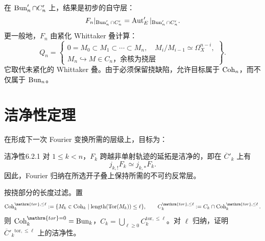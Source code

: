 在 $\operatorname{Bun}'_n\cap C'_n$ 上，结果是初步的自守层：
\[F_n|_{\operatorname{Bun}'_n\cap C'_n}=\operatorname{Aut}'_E|_{\operatorname{Bun}'_n\cap C'_n}.\]
更一般地，$F_n$ 由紧化 Whittaker 叠计算：
\[Q_n=\left\{\begin{array}{l}0=M_0\subset M_1\subset\cdots\subset M_n,\quad M_i/M_{i-1}\simeq\Omega_X^{n-i},\\M_n\hookrightarrow M\in C_n\text{，余核为挠层}\end{array}\right\}.\]
它取代未紧化的 Whittaker 叠。由于必须保留挠缺陷，允许目标属于 $\operatorname{Coh}_n$，而不仅属于 $\operatorname{Bun}_n$。
\section{洁净性定理}\label{sec:6.2}
在形成下一次 Fourier 变换所需的层级上，目标为：
\begin{theorem}{洁净性}{6.2.1}
对 $1\le k<n$，$F_k$ 跨越非单射轨迹的延拓是洁净的，即在 $\overline C'_k$ 上有
\[j_{k,!}F_k\simeq j_{k,*}F_k.\]
因此，Fourier 归纳在所选开子叠上保持所需的不可约反常层。
\end{theorem}

按挠部分的长度过滤。置
\[\Coh_k^{\mathrm{tor},\le\ell}:=\{M_k\in\Coh_k\mid\length(\operatorname{Tor}(M_k))\le\ell\},\qquad C_k^{\mathrm{tor},\le\ell}:=C_k\cap\Coh_k^{\mathrm{tor},\le\ell}.\]
则 $\Coh_k^{\mathrm{tor}=0}=\Bun_k$，$C_k=\bigcup_{\ell\ge0}C_k^{\mathrm{tor},\le\ell}$。对 $\ell$ 归纳，证明 $\overline C'_k{}^{\mathrm{tor},\le\ell}$ 上的洁净性。
